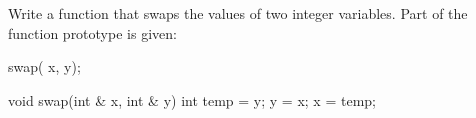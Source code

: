 \nextq
Write a function that swaps the values of two integer variables.
Part of the function prototype is given:
\begin{console}
    swap(     x,    y);
\end{console}
\ANSWER
\begin{answercode}
void swap(int & x, int & y)
{
  int temp = y;
  y = x;
  x = temp;
}
\end{answercode}


